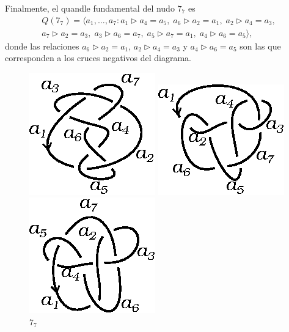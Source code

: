 \documentclass[graybox]{svmult}
\begin{document}
	Finalmente, el quandle fundamental del nudo $7_7$ es
	\begin{multline}
		Q(7_7)=\langle a_1,\dots,a_7:
		a_1\triangleright a_4=a_5,\;
		a_6\triangleright a_2=a_1,\;
		a_2\triangleright a_4=a_3,\\
		a_7\triangleright a_2=a_3,\;
		a_3\triangleright a_6=a_7,\;
		a_5\triangleright a_7=a_1,\;
		a_4\triangleright a_6=a_5\rangle,
	\end{multline}
    donde las relaciones $a_6\triangleright a_2=a_1$, $a_2\triangleright
    a_4=a_3$ y $a_4\triangleright a_6=a_5$ son las que corresponden a los
    cruces negativos del diagrama. 

\begin{figure}[ht]
		\centering
    	\begin{minipage}{0.4\textwidth}
			\centering
	    	\includegraphics[scale=0.7]{images/7_5}
			\caption{$7_5$}
			\label{fig:7_5}
		\end{minipage}
		\begin{minipage}{0.4\textwidth}
			\centering
	    	\includegraphics[scale=0.7]{images/7_6}
			\caption{$7_6$}
			\label{fig:7_6}
		\end{minipage}
		\begin{minipage}{0.4\textwidth}
			\centering
	    	\includegraphics[scale=0.7]{images/7_7}
			\caption{$7_7$}
			\label{fig:7_7}
		\end{minipage}
	\end{figure}
\end{document}
